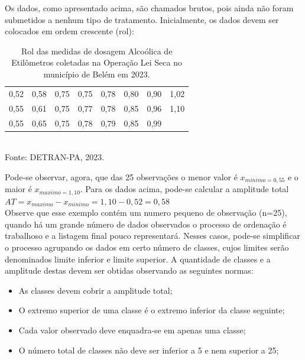 Os dados, como apresentado acima, são chamados brutos, pois ainda não foram submetidos a nenhum tipo de tratamento. Inicialmente, os dados devem ser colocados em ordem crescente (rol):


\begin{table}[!htb]
    \centering
    {
    \caption{Rol das medidas de dosagem Alcoólica de Etilômetros coletadas na Operação Lei Seca no município de Belém em 2023.}
    \label{estatura}
    \vspace{0.2cm}
\begin{tabular}{c|c|c|c|c|c|c|c}
  \hline\hline
  0,52 & 0,58 & 0,75 & 0,75 & 0,78 & 0,80 & 0,90 & 1,02 \\
  0,55 & 0,61 & 0,75 & 0,77 & 0,78 & 0,85 & 0,96 & 1,10  \\
  0,55 & 0,65 & 0,75 & 0,78 & 0,79 & 0,85 & 0,99 &     \\
  \hline\hline
\end{tabular}}
\\
\hspace{-4.5cm}
Fonte: DETRAN-PA, 2023.
\end{table}


\newpage 
Pode-se observar, agora, que das 25 observações o menor valor é $x_{minimo = 0,55}$ e o maior é $x_{maximo= 1,10}$. Para os dados acima, pode-se calcular a amplitude total $AT = x_{maximo}-x_{minimo}=1,10-0,52=0,58$
\\



Observe que esse exemplo contém um numero pequeno de observação (n=25), quando há um grande número de dados observados o processo de ordenação é trabalhoso e a listagem final pouco representará. Nesses casos, pode-se simplificar o processo agrupando os dados em certo número de classes, cujos limites serão denominados limite inferior e limite superior. A quantidade de classes e a amplitude destas devem ser obtidas observando as seguintes normas:



\begin{itemize}
  \item As classes devem cobrir a amplitude total;
  \item O extremo superior de uma classe é o extremo inferior da classe seguinte;
  \item Cada valor observado deve enquadra-se em apenas uma classe;
  \item O número total de classes não deve ser inferior a 5 e nem superior a 25;
\end{itemize}


